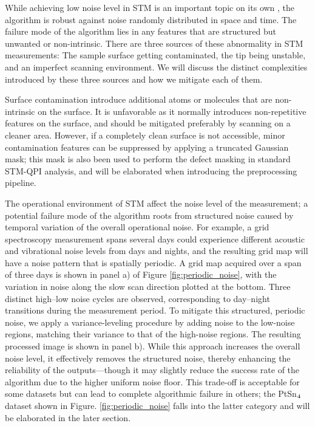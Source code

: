 While achieving low noise level in \ac{STM} is an important topic on its own \cite{Jian-Feng Ge}, the algorithm is robust against noise randomly distributed in space and time. The failure mode of the algorithm lies in any features that are structured but unwanted or non-intrinsic. There are three sources of these abnormality in \ac{STM} measurements: The sample surface getting contaminated, the tip being unstable, and an imperfect scanning environment. We will discuss the distinct complexities introduced by these three sources and how we mitigate each of them.  

Surface contamination introduce additional atoms or molecules that are non-intrinsic on the surface. It is unfavorable as it normally introduces non-repetitive features on the surface, and should be mitigated preferably by scanning on a cleaner area. However, if a completely clean surface is not accessible, minor contamination features can be suppressed by applying a truncated Gaussian mask; this mask is also been used to perform the defect masking in standard STM-QPI analysis, and will be elaborated when introducing the preprocessing pipeline.

The operational environment of STM affect the noise level of the measurement; a potential failure mode of the algorithm roots from structured noise caused by temporal variation of the overall operational noise. For example, a grid spectroscopy measurement spans several days could experience different acoustic and vibrational noise levels from days and nights, and the resulting grid map will have a noise pattern that is spatially periodic. A grid map acquired over a span of three days is shown in panel a) of Figure \ref{fig:periodic_noise}, with the variation in noise along the slow scan direction plotted at the bottom. Three distinct high–low noise cycles are observed, corresponding to day–night transitions during the measurement period. To mitigate this structured, periodic noise, we apply a variance-leveling procedure by adding noise to the low-noise regions, matching their variance to that of the high-noise regions. The resulting processed image is shown in panel b). While this approach increases the overall noise level, it effectively removes the structured noise, thereby enhancing the reliability of the outputs—though it may slightly reduce the success rate of the algorithm due to the higher uniform noise floor. This trade-off is acceptable for some datasets but can lead to complete algorithmic failure in others; the PtSn$\textsubscript{4}$ dataset shown in Figure. \ref{fig:periodic_noise} falls into the latter category and will be elaborated in the later section. 

